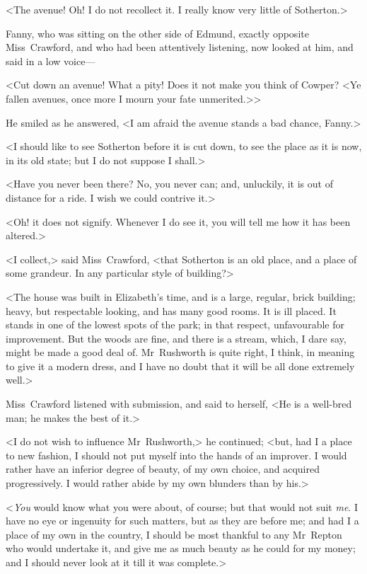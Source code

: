 <The avenue! Oh! I do not recollect it. I really know very little of Sotherton.>

Fanny, who was sitting on the other side of Edmund, exactly opposite Miss~Crawford, and who had been attentively listening, now looked at him, and said in a low voice—

<Cut down an avenue! What a pity! Does it not make you think of Cowper? <Ye fallen avenues, once more I mourn your fate unmerited.>>

He smiled as he answered, <I am afraid the avenue stands a bad chance, Fanny.>

<I should like to see Sotherton before it is cut down, to see the place as it is now, in its old state; but I do not suppose I shall.>

<Have you never been there? No, you never can; and, unluckily, it is out of distance for a ride. I wish we could contrive it.>

<Oh! it does not signify. Whenever I do see it, you will tell me how it has been altered.>

<I collect,> said Miss~Crawford, <that Sotherton is an old place, and a place of some grandeur. In any particular style of building?>

<The house was built in Elizabeth's time, and is a large, regular, brick building; heavy, but respectable looking, and has many good rooms. It is ill placed. It stands in one of the lowest spots of the park; in that respect, unfavourable for improvement. But the woods are fine, and there is a stream, which, I dare say, might be made a good deal of. Mr~Rushworth is quite right, I think, in meaning to give it a modern dress, and I have no doubt that it will be all done extremely well.>

Miss~Crawford listened with submission, and said to herself, <He is a well-bred man; he makes the best of it.>

<I do not wish to influence Mr~Rushworth,> he continued; <but, had I a place to new fashion, I should not put myself into the hands of an improver. I would rather have an inferior degree of beauty, of my own choice, and acquired progressively. I would rather abide by my own blunders than by his.>

<\textit{You}  would know what you were about, of course; but that would not suit \textit{me}. I have no eye or ingenuity for such matters, but as they are before me; and had I a place of my own in the country, I should be most thankful to any Mr~Repton who would undertake it, and give me as much beauty as he could for my money; and I should never look at it till it was complete.>

